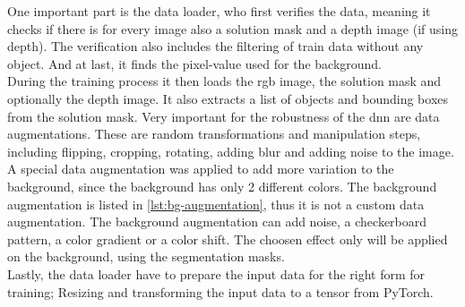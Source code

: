 		One important part is the data loader, who first verifies the data, meaning it checks if there is for every image also a solution mask and a depth image (if using depth). The verification also includes the filtering of train data without any object. And at last, it finds the pixel-value used for the background.\\
		During the training process it then loads the rgb image, the solution mask and optionally the depth image. It also extracts a list of objects and bounding boxes from the solution mask. Very important for the robustness of the \ac{dnn} are data augmentations. These are random transformations and manipulation steps, including flipping, cropping, rotating, adding blur and adding noise to the image. A special data augmentation was applied to add more variation to the background, since the background has only 2 different colors. The background augmentation is listed in \ref{lst:bg-augmentation}, thus it is not a custom data augmentation. The background augmentation can add noise, a checkerboard pattern, a color gradient or a color shift. The choosen effect only will be applied on the background, using the segmentation masks. \\
		Lastly, the data loader have to prepare the input data for the right form for training; Resizing and transforming the input data to a tensor from PyTorch.
		
